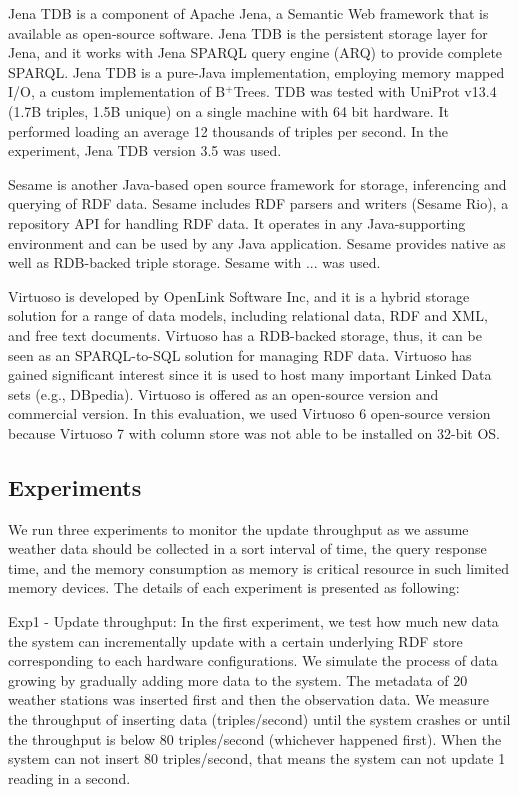 Jena TDB is a component of Apache Jena, a Semantic Web framework that is available as open-source software.
Jena TDB is the persistent storage layer for Jena, and it works with Jena SPARQL query engine (ARQ) to provide complete SPARQL.
Jena TDB is a pure-Java implementation, employing memory mapped I/O, a custom implementation of B$^+$Trees.
TDB was tested with UniProt v13.4 (1.7B triples, 1.5B unique) on a single machine with 64 bit hardware.
It performed loading an average 12 thousands of triples per second.
In the experiment, Jena TDB version 3.5 was used.

Sesame is another Java-based open source framework for storage, inferencing and querying of RDF data.
Sesame includes RDF parsers and writers (Sesame Rio), a repository API for handling RDF data. 
It operates in any Java-supporting environment and can be used by any Java application.
Sesame provides native as well as RDB-backed triple storage. 
Sesame with ... was used.

Virtuoso is developed by OpenLink Software Inc, and it is a hybrid storage solution for a range of data models, including relational data, RDF and XML, and free text documents. 
Virtuoso has a RDB-backed storage, thus, it can be seen as an SPARQL-to-SQL solution for managing RDF data.
Virtuoso has gained significant interest since it is used to host many important Linked Data sets (e.g., DBpedia).
Virtuoso is offered as an open-source version and commercial version.
In this evaluation, we used Virtuoso 6 open-source version because Virtuoso 7 with column store was not able to be installed on 32-bit OS.

\subsection{Experiments}

We run three experiments to monitor the update throughput as we assume weather data should be collected in a sort interval of time, the query response time, and the memory consumption as memory is critical resource in such limited memory devices. The details of each experiment is presented as following:

{Exp1 - Update throughput:}
In the first experiment, we test how much new data the system can incrementally update with a certain underlying RDF store corresponding to each hardware configurations. 
We simulate the process of data growing by gradually adding more data to the system.
The metadata of 20 weather stations was inserted first and then the observation data.
We measure the throughput of inserting data (triples/second) until the system crashes or until the throughput is below 80 triples/second (whichever happened first).
When the system can not insert 80 triples/second, that means the system can not update 1 reading in a second.

